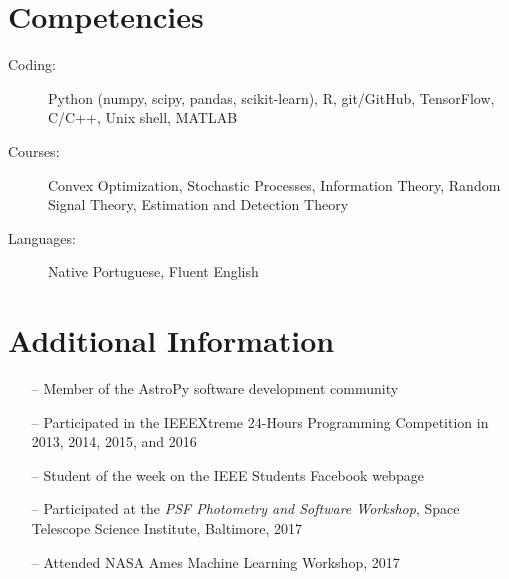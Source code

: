 \documentclass[10pt]{article}
\begin{document}
\begin{titlepage}
\section*{Competencies}
\begin{description}
    \item[Coding:] Python (numpy, scipy, pandas, scikit-learn), R, git/GitHub, TensorFlow, C/C++, Unix shell, MATLAB
    \item[Courses:] Convex Optimization, Stochastic Processes, Information Theory, Random Signal Theory,
      Estimation and Detection Theory
    \item[Languages:] Native Portuguese, Fluent English
\end{description}

\section*{Additional Information}
\begin{itemize}
    \item[--] Member of the AstroPy software development community
    \item[--] Participated in the IEEEXtreme 24-Hours Programming Competition in 2013, 2014, 2015, and 2016
    \item[--] Student of the week on the IEEE Students Facebook webpage
    \item[--] Participated at the \textit{PSF Photometry and Software Workshop}, Space Telescope Science Institute, Baltimore, 2017
    \item[--] Attended NASA Ames Machine Learning Workshop, 2017
\end{itemize}

\end{titlepage}
\end{document}
